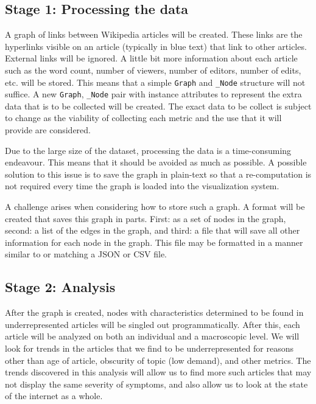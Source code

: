 \documentclass[fontsize=12pt]{article}
\begin{document}
\begin{multicols}{2}
    \subsection{Stage 1: Processing the data}
    A graph of links between Wikipedia articles will be created.
    These links are the hyperlinks visible on an article (typically in blue text) that link to other articles.
    External links will be ignored.
    A little bit more information about each article such as the word count, number of viewers, number of editors, number of edits, etc. will be stored.
    This means that a simple \texttt{Graph} and \texttt{\_Node} structure will not suffice.
    A new \texttt{Graph}, \texttt{\_Node} pair with instance attributes to represent the extra data that is to be collected will be created.
    The exact data to be collect is subject to change as the viability of collecting each metric and the use that it will provide are considered.

    Due to the large size of the dataset, processing the data is a time-consuming endeavour.
    This means that it should be avoided as much as possible.
    A possible solution to this issue is to save the graph in plain-text so that a re-computation is not required every time the graph is loaded into the visualization system.

    A challenge arises when considering how to store such a graph.
    A format will be created that saves this graph in parts.
    First: as a set of nodes in the graph, second: a list of the edges in the graph, and third: a file that will save all other information for each node in the graph.
    This file may be formatted in a manner similar to or matching a JSON or CSV file.

    \subsection{Stage 2: Analysis}
    After the graph is created, nodes with characteristics determined to be found in underrepresented articles will be singled out programmatically.
    After this, each article will be analyzed on both an individual and a macroscopic level.
    We will look for trends in the articles that we find to be underrepresented for reasons other than age of article, obscurity of topic (low demand), and other metrics.
    The trends discovered in this analysis will allow us to find more such articles that may not display the same severity of symptoms, and also allow us to look at the state of the internet as a whole.


\end{multicols}
\end{document}
